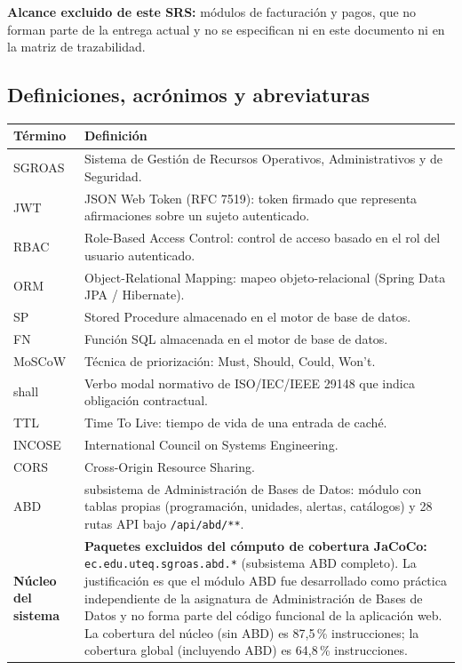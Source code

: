 \documentclass[12pt,a4paper]{article}
\begin{document}
\textbf{Alcance excluido de este SRS:} módulos de facturación y pagos, que no forman parte de la entrega actual y no se especifican ni en este documento ni en la matriz de trazabilidad.

\subsection{Definiciones, acrónimos y abreviaturas}
\label{sec:definiciones}

\begin{longtable}{@{}p{3.5cm}p{10.5cm}@{}}
\toprule
\textbf{Término} & \textbf{Definición} \\
\midrule
\endhead
SGROAS & Sistema de Gestión de Recursos Operativos, Administrativos y de Seguridad. \\
JWT & JSON Web Token (RFC 7519): token firmado que representa afirmaciones sobre un sujeto autenticado. \\
RBAC & Role-Based Access Control: control de acceso basado en el rol del usuario autenticado. \\
ORM & Object-Relational Mapping: mapeo objeto-relacional (Spring Data JPA / Hibernate). \\
SP & Stored Procedure almacenado en el motor de base de datos. \\
FN & Función SQL almacenada en el motor de base de datos. \\
MoSCoW & Técnica de priorización: Must, Should, Could, Won't. \\
shall & Verbo modal normativo de ISO/IEC/IEEE 29148 que indica obligación contractual. \\
TTL & Time To Live: tiempo de vida de una entrada de caché. \\
INCOSE & International Council on Systems Engineering. \\
CORS & Cross-Origin Resource Sharing. \\
ABD & subsistema de Administración de Bases de Datos: módulo con tablas propias (programación, unidades, alertas, catálogos) y 28 rutas API bajo \texttt{/api/abd/**}. \\
\textbf{Núcleo del sistema} & \textbf{Paquetes excluidos del cómputo de cobertura JaCoCo:} \texttt{ec.edu.uteq.sgroas.abd.*} (subsistema ABD completo). La justificación es que el módulo ABD fue desarrollado como práctica independiente de la asignatura de Administración de Bases de Datos y no forma parte del código funcional de la aplicación web. La cobertura del núcleo (sin ABD) es 87,5\,\% instrucciones; la cobertura global (incluyendo ABD) es 64,8\,\% instrucciones. \\
\bottomrule
\end{longtable}
\end{document}
